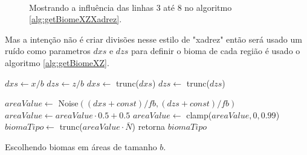  
\begin{figure}[H]
     \centering
     \hspace{0.1cm}
     \\
     
     \caption{Mostrando a influência das linhas 3 até 8 no algoritmo \ref{alg:getBiomeXZXadrez}.}
     
     \label{fig:ssxadrez}
\end{figure}

Mas a intenção não é criar divisões nesse estilo de "xadrez" então será usado um 
ruído como parametros $dxs$ e $dzs$ para definir o bioma de cada região é usado
o algoritmo \ref{alg:getBiomeXZ}.

\begin{algorithm}[H]\label{alg:getBiomeXZ}
    $dxs \leftarrow x/b$\;
    $dzs \leftarrow z/b$\;
    $dxs \leftarrow$ trunc($dxs$)\;
    $dzs \leftarrow$ trunc($dzs$)\;
    
    $areaValue \leftarrow$ Noise$((dxs + const)/fb, (dzs + const)/fb)$\;
    $areaValue \leftarrow  areaValue \cdot 0.5 + 0.5$\;
    $areaValue \leftarrow$ clamp($areaValue, 0, 0.99$)\;
    $biomaTipo \leftarrow$ trunc($areaValue \cdot \bar{N}$)\;
    retorna $biomaTipo$\;
    \caption{Escolhendo biomas em áreas de tamanho $b$.}
\end{algorithm}


